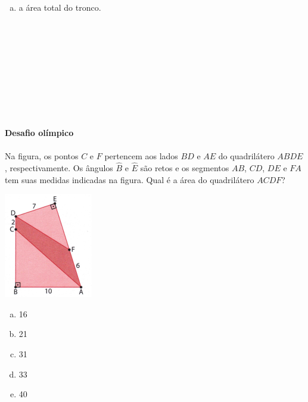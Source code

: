 \documentclass[a4paper,14pt]{article}
\begin{document}
\begin{multicols}{2}
\begin{enumerate}
\begin{enumerate}[a)]
            	\item a área total do tronco.\\\\\\\\\\\\\\\\\\\\
            \end{enumerate}
            \textbf{Desafio olímpico}
\\\\
            Na figura, os pontos $C$ e $F$ pertencem aos lados $BD$ e $AE$ do quadrilátero $ABDE$, respectivamente. Os ângulos $\hat{B}$ e $\hat{E}$ são retos e os segmentos $AB$, $CD$, $DE$ e $FA$ tem suas medidas indicadas na figura. Qual é a área do quadrilátero $ACDF$?
            \begin{center}
            	\includegraphics[width=0.7\linewidth]{8FMA30_imagens/aula30-3}
            \end{center}
            \begin{enumerate}[a)]
            	\item 16
            	\item 21
            	\item 31
            	\item 33
            	\item 40
            \end{enumerate}

\end{enumerate}
\end{multicols}
\end{document}
